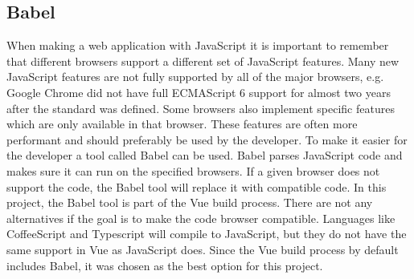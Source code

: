 \subsection{Babel}
When making a web application with JavaScript it is important to remember that different browsers support a different set of JavaScript features. Many new JavaScript features are not fully supported by all of the major browsers, e.g. Google Chrome did not have full ECMAScript 6 support for almost two years after the standard was defined. Some browsers also implement specific features which are only available in that browser. These features are often more performant and should preferably be used by the developer. To make it easier for the developer a tool called Babel\cite{Babel:Info} can be used. Babel parses JavaScript code and makes sure it can run on the specified browsers. If a given browser does not support the code, the Babel tool will replace it with compatible code. In this project, the Babel tool is part of the Vue build process. There are not any alternatives if the goal is to make the code browser compatible. Languages like CoffeeScript and Typescript will compile to JavaScript, but they do not have the same support in Vue as JavaScript does. Since the Vue build process by default includes Babel, it was chosen as the best option for this project.